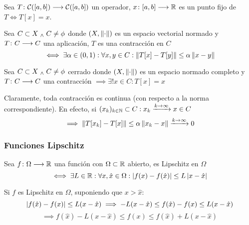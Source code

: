 \begin{defn}
	Sea $T \colon \mathcal{C}([a,b]) \longrightarrow \mathcal{C}([a,b])$ un operador, $x \colon [a,b] \longrightarrow \mathbb{R}$ es un punto fijo de $T \iff T[x]=x$.
\end{defn}
\begin{defn}[Contracción]
	Sea $C \subset X \; _{\wedge} \; C \ne \phi$ donde $(X, \left\Vert\cdot\right\Vert)$ es un espacio vectorial normado y $T \colon C \longrightarrow C$ una aplicación, $T$ es una contracción en $C$ \[\iff \exists \alpha \in (0,1) : \forall x, y \in C : \left\Vert T[x]-T[y]\right\Vert\leq \alpha \left\Vert x-y\right\Vert\]
\end{defn}
\begin{teo}
	Sea $C \subset X\; _{\wedge} \; C\ne \phi$ cerrado donde $(X, \left\Vert\cdot\right\Vert)$ es un espacio normado completo y $T \colon C \longrightarrow C$ una contracción $\implies \exists! x\in C : T[x]=x$
	\begin{dem}

	\end{dem}
\end{teo}
\begin{obs}
	Claramente, toda contracción es continua (con respecto a la norma correspondiente). En efecto, si $(x_k)_{k\in\mathbb{N}} \subset C : x_k\xrightarrow{k\to\infty} x \in C$
	\[\implies \left\Vert T[x_k]-T[x]\right\Vert\leq \alpha \left\Vert x_k-x\right\Vert \xrightarrow{k\to\infty} 0\]
\end{obs}

\subsubsection{Funciones Lipschitz}
\begin{defn}
	Sea $f \colon \Omega \longrightarrow \mathbb{R}$ una función con $\Omega\subset \mathbb{R}$ abierto, es Lipschitz en $\Omega$ 
	\[\iff\exists L \in \mathbb{R} : \forall x, \hat{x} \in \Omega : \left|f(x)-f(\hat{x})\right|\leq L\left|x-\hat{x}\right|\]
\end{defn}
Si $f$ es Lipschitz en $\Omega$, suponiendo que $x > \hat{x}$:
\[\left|f(\hat{x})-f(x)\right|\leq L(x-\hat{x}) \implies - L(x-\hat{x}) \leq f(\hat{x})-f(x) \leq L(x-\hat{x}) \]
\[\implies f(\hat{x})-L(x-\hat{x}) \leq f(x) \leq f(\hat{x})+L(x-\hat{x})\] %

